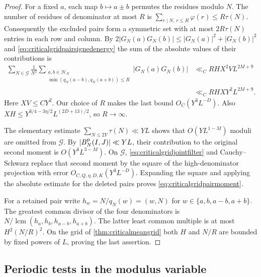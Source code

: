 \documentclass[11pt,a4paper]{article}
\numberwithin{equation}{section}
\begin{document}
\begin{proof}
For a fixed $a$, each map $b\mapsto a\pm b$ permutes the
residues modulo $N$. The number of residues of denominator
at most $R$ is $\sum_{r\mid N,\,r\le R}\varphi(r)\le R\tau(N)$.
Consequently the excluded pairs form a symmetric set with
at most $2R\tau(N)$ entries in each row and column.
By $2|G_N(a)G_N(b)|\le |G_N(a)|^2+|G_N(b)|^2$ and
\cref{eq:criticalgridpairsignedenergy} the sum of the absolute
values of their contributions is
\begin{align*}
 \sum_{N\in\mathcal G}\frac{1}{N^2}
 \sum_{\substack{a,b\in\mathcal H_N\\
               \min(q_N(a-b),q_N(a+b))\le R}}
       |G_N(a)G_N(b)|
 &\ll_C R H X^2 V L^{2M+9}\\
 &\ll_C R H X Y^2 L^{2M+9}.
\end{align*}
Here $XV\le CY^2$. Our choice of $R$ makes the last bound
$O_C(Y^3L^{-D})$. Also $XH\le
Y^{3/4-3\eta/2} L^{(2D+13)/2}$, so $R\to\infty$.

The elementary estimate $\sum_{N\le2Y}\tau(N)\ll YL$
shows that $O(YL^{1-M})$ moduli are omitted from $\mathcal G$.
By $|B_N^{\rm p}(I,J)|\ll YL$, their contribution to the
original second moment is $O(Y^3L^{3-M})$.
On $\mathcal G$, \cref{eq:criticalgridjointfilter} and
Cauchy--Schwarz replace that second moment by the square
of the high-denominator projection with error
$O_{C,Q,\eta,D,K}(Y^3L^{-D})$. Expanding the square and applying
the absolute estimate for the deleted pairs proves
\cref{eq:criticalgridpairmoment}.

For a retained pair write $h_w=N/q_N(w)=(w,N)$ for
$w\in\{a,b,a-b,a+b\}$. The greatest common divisor of the
four denominators is $N/\operatorname{lcm}(h_a,h_b,h_{a-b},h_{a+b})$.
The latter least common multiple is at most $H^2(N/R)^2$.
On the grid of \cref{thm:criticalmeangrid} both $H$ and
$N/R$ are bounded by fixed powers of $L$, proving the last
assertion.
\end{proof}

\clearpage
\subsection{Periodic tests in the modulus variable}
\end{document}
